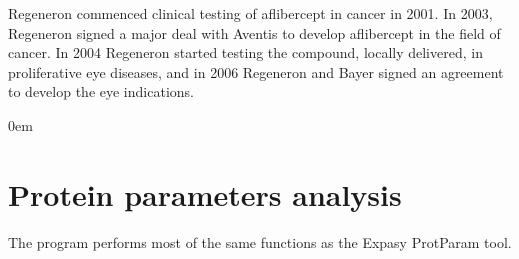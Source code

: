 \documentclass[letterpaper,10pt,english]{jupyterBook}
\begin{document}
\sphinxAtStartPar
Regeneron commenced clinical testing of aflibercept in cancer in 2001. In 2003, Regeneron signed a major deal with Aventis to develop aflibercept in the field of cancer. In 2004 Regeneron started testing the compound, locally delivered, in proliferative eye diseases, and in 2006 Regeneron and Bayer signed an agreement to develop the eye indications.

\begin{DUlineblock}{0em}
\item[] 
\end{DUlineblock}

\begin{sphinxVerbatim}[commandchars=\\\{\}]
\end{sphinxVerbatim}

\sphinxstepscope


\chapter{Protein parameters analysis}
\label{\detokenize{ipynb/chapter1:protein-parameters-analysis}}\label{\detokenize{ipynb/chapter1::doc}}
\sphinxAtStartPar
The program performs most of the same functions as the Expasy ProtParam tool.
\end{document}
